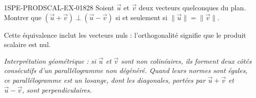 \begin{exercice}{1SPE-PRODSCAL-EX-018}{2}{8}
Soient $\vec u$ et $\vec v$ deux vecteurs quelconques du plan. Montrer que $(\vec{u} + \vec{v}) \perp (\vec{u} - \vec{v})$ si et seulement si $\|\vec{u}\| = \|\vec{v}\|$.

Cette équivalence inclut les vecteurs nuls : l'orthogonalité signifie que le produit scalaire est nul.

\textit{Interprétation géométrique : si $\vec u$ et $\vec v$ sont non colinéaires,
ils forment deux côtés consécutifs d'un parallélogramme non dégénéré.
Quand leurs normes sont égales, ce parallélogramme est un losange, dont les diagonales,
portées par $\vec u+\vec v$ et $\vec u-\vec v$, sont perpendiculaires.}
\end{exercice}
